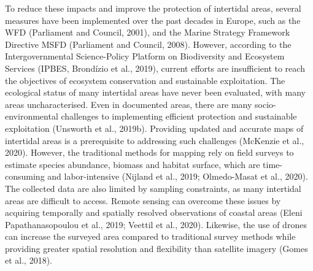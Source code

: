 \documentclass[
  letterpaper,
  11pt,
  english,
  singlespacing,
  headsepline]{MastersDoctoralThesis}
\begin{document}
\begin{spacing}{1.5}
To reduce these impacts and improve the protection of intertidal areas,
several measures have been implemented over the past decades in Europe,
such as the WFD (Parliament and Council, 2001), and the Marine Strategy
Framework Directive MSFD (Parliament and Council, 2008). However,
according to the Intergovernmental Science-Policy Platform on
Biodiversity and Ecosystem Services (IPBES, Brondízio et al., 2019),
current efforts are insufficient to reach the objectives of ecosystem
conservation and sustainable exploitation. The ecological status of many
intertidal areas have never been evaluated, with many areas
uncharacterised. Even in documented areas, there are many
socio-environmental challenges to implementing efficient protection and
sustainable exploitation (Unsworth et al., 2019b). Providing updated and
accurate maps of intertidal areas is a prerequisite to addressing such
challenges (McKenzie et al., 2020). However, the traditional methods for
mapping rely on field surveys to estimate species abundance, biomass and
habitat surface, which are time-consuming and labor-intensive (Nijland
et al., 2019; Olmedo-Masat et al., 2020). The collected data are also
limited by sampling constraints, as many intertidal areas are difficult
to access. Remote sensing can overcome these issues by acquiring
temporally and spatially resolved observations of coastal areas (Eleni
Papathanasopoulou et al., 2019; Veettil et al., 2020). Likewise, the use
of drones can increase the surveyed area compared to traditional survey
methods while providing greater spatial resolution and flexibility than
satellite imagery (Gomes et al., 2018).


\end{spacing}
\end{document}
